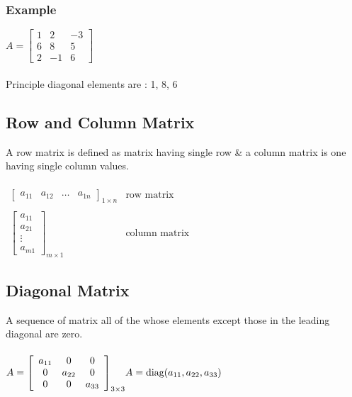 \documentclass{article}
\begin{document}
	\subsubsection{Example}
	$ A = \left[ \begin{array}{ccc}
		1 & 2 & -3 \\
		6 & 8 & 5 \\
		2 & -1 & 6
	\end{array}\right] $
	\\ \\
	Principle diagonal elements are : 1, 8, 6
	
	\subsection{Row and Column Matrix}
	A row matrix is defined as matrix having single row \& a column matrix is one having single column values.
	\\ \\
	$ \begin{array}{cc}
		{
			\left[ \begin{array}{cccc}
				a_{11} & a_{12} & \dots & a_{1n}
			\end{array}\right] 
		}_{1 \times n}
		& \text{row matrix}
		\\ \\
		{
			\left[ \begin{array}{c}
				a_{11} \\ a_{21} \\ \vdots \\ a_{m1}
			\end{array}\right]
		}_{m \times 1}
		& \text{column matrix}
	\end{array} $
	
	\subsection{Diagonal Matrix}
	A sequence of matrix all of the whose elements except those in the leading diagonal are zero.
	\\ \\
	$ A = {
		\left[ \begin{array}{ccc}
			a_{11} & 0 & 0 \\
			0 & a_{22} & 0 \\
			0 & 0 & a_{33}
		\end{array}\right]
	}_{3 \times 3} 
	\\ \\
	A = \text{diag}( a_{11}, a_{22}, a_{33})$
	
\end{document}
